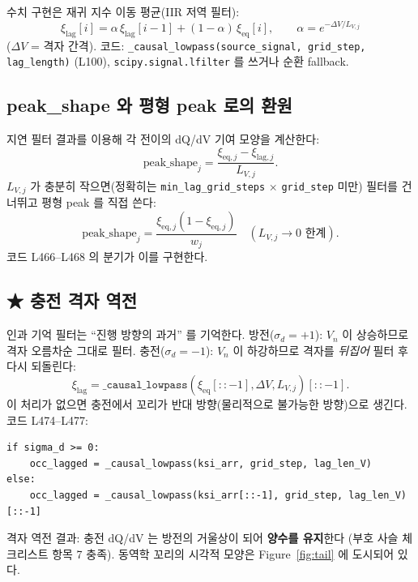 \documentclass[11pt,a4paper]{article}
\newcommand{\eq}{\mathrm{eq}}
\begin{document}
수치 구현은 재귀 지수 이동 평균(IIR 저역 필터):
\begin{equation}
\xi_\mathrm{lag}[i] = \alpha\,\xi_\mathrm{lag}[i-1] + (1-\alpha)\,\xi_\eq[i],\qquad
\alpha = e^{-\Delta V/L_{V,j}}
\label{eq:iir}
\end{equation}
($\Delta V$ = 격자 간격). 코드: \texttt{\_causal\_lowpass(source\_signal, grid\_step, lag\_length)} (L100),
\texttt{scipy.signal.lfilter} 를 쓰거나 순환 fallback.

\subsection{peak\_shape 와 평형 peak 로의 환원}

지연 필터 결과를 이용해 각 전이의 dQ/dV 기여 모양을 계산한다:
\begin{equation}
\text{peak\_shape}_j = \frac{\xi_{\eq,j} - \xi_{\mathrm{lag},j}}{L_{V,j}}.
\label{eq:peakshape}
\end{equation}
$L_{V,j}$ 가 충분히 작으면(정확히는 \texttt{min\_lag\_grid\_steps} $\times$ \texttt{grid\_step}
미만) 필터를 건너뛰고 평형 peak 를 직접 쓴다:
\begin{equation}
\text{peak\_shape}_j = \frac{\xi_{\eq,j}(1-\xi_{\eq,j})}{w_j}\quad (L_{V,j} \to 0 \text{ 한계}).
\label{eq:eqrecover}
\end{equation}
코드 L466--L468 의 분기가 이를 구현한다.

\subsection{★ 충전 격자 역전}

인과 기억 필터는 ``진행 방향의 과거'' 를 기억한다.
방전($\sigma_d=+1$): $V_n$ 이 상승하므로 격자 오름차순 그대로 필터.
충전($\sigma_d=-1$): $V_n$ 이 하강하므로 격자를 \emph{뒤집어} 필터 후 다시 되돌린다:
\begin{equation}
\xi_\mathrm{lag} = \texttt{\_causal\_lowpass}(\xi_\eq[::-1], \Delta V, L_{V,j})[::-1].
\label{eq:reverse}
\end{equation}
이 처리가 없으면 충전에서 꼬리가 반대 방향(물리적으로 불가능한 방향)으로 생긴다.
코드 L474--L477:
\begin{verbatim}
if sigma_d >= 0:
    occ_lagged = _causal_lowpass(ksi_arr, grid_step, lag_len_V)
else:
    occ_lagged = _causal_lowpass(ksi_arr[::-1], grid_step, lag_len_V)[::-1]
\end{verbatim}
격자 역전 결과: 충전 dQ/dV 는 방전의 거울상이 되어 \textbf{양수를 유지}한다
(부호 사슬 체크리스트 항목 7 충족). 동역학 꼬리의 시각적 모양은
Figure~\ref{fig:tail} 에 도시되어 있다.
\end{document}
